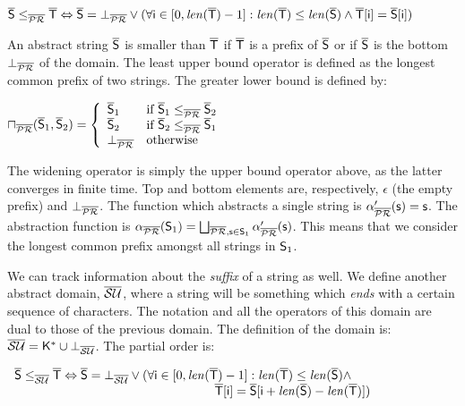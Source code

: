 \documentclass[orivec]{llncs}
\begin{document}
\noindent $\mathsf{\overline{S}} \leq_{\mathsf{\overline{\mathsf{\mathcal{PR}}}}} \mathsf{\overline{T}} \Leftrightarrow \mathsf{\overline{S}} = \bot_{\mathsf{\overline{\mathsf{\mathcal{PR}}}}} \lor (\forall \mathsf{i} \in [0, \mathit{len}(\mathsf{\overline{T}})-1] : \mathit{len}(\mathsf{\overline{T}}) \leq \mathit{len}(\mathsf{\overline{S}}) \land \mathsf{\overline{T}}[\mathsf{i}] =  \mathsf{\overline{S}}[\mathsf{i}]) $

An abstract string $\mathsf{\overline{S}}$ is smaller than $\mathsf{\overline{T}}$ if $\mathsf{\overline{T}}$ is a prefix of $\mathsf{\overline{S}}$ or if $\mathsf{\overline{S}}$ is the bottom $\bot_{\mathsf{\overline{\mathsf{\mathcal{PR}}}}}$ of the domain. The least upper bound operator is defined as the longest common prefix of two strings. The greater lower bound is defined by:
 
$
\sqcap_{\mathsf{\overline{\mathsf{\mathcal{PR}}}}} (\mathsf{\overline{S}}_1, \mathsf{\overline{S}}_2) = \left\{ \begin{array}{ll}
\mathsf{\overline{S}}_1 & \mbox{if } \mathsf{\overline{S}}_1 \leq_{\mathsf{\overline{\mathsf{\mathcal{PR}}}}} \mathsf{\overline{S}}_2 \\
\mathsf{\overline{S}}_2 & \mbox{if } \mathsf{\overline{S}}_2 \leq_{\mathsf{\overline{\mathsf{\mathcal{PR}}}}} \mathsf{\overline{S}}_1 \\
\bot_{\mathsf{\overline{\mathsf{\mathcal{PR}}}}} & \mbox{otherwise}
\end{array}\right.
$

The widening operator is simply the upper bound operator above, as the latter converges in finite time.
Top and bottom elements are, respectively, $\epsilon$ (the empty prefix) and $\bot_{\mathsf{\overline{\mathsf{\mathcal{PR}}}}}$. The function which abstracts a single string is $\alpha^{\prime}_{\mathsf{\overline{\mathsf{\mathcal{PR}}}}}(\mathsf{s})= \mathsf{s}$. The abstraction function is  
$\alpha_{\mathsf{\overline{\mathsf{\mathcal{PR}}}}}(\mathsf{S}_1) = \bigsqcup_{\mathsf{\overline{\mathsf{\mathcal{PR}}}}, \mathsf{s} \in \mathsf{S}_1}{\alpha^{\prime}_{\mathsf{\overline{\mathsf{\mathcal{PR}}}}}(\mathsf{s})}$.
This means that we consider the longest common prefix amongst all strings in $\mathsf{S}_1$. 

We can track information about the \emph{suffix} of a string as well. We define another abstract domain, $\mathsf{\overline{\mathsf{\mathcal{SU}}}}$, where a string will be something which \textit{ends} with a certain sequence of characters. The notation and all the operators of this domain are dual to those of the previous domain. The definition of the domain is: $\mathsf{\overline{\mathsf{\mathcal{SU}}}} = \mathsf{K}^* \cup \bot_{\mathsf{\overline{\mathsf{\mathcal{SU}}}}}$. The partial order is: 
 
$\begin{array}{l}
\aset{S}\leq_{\asuffix} \aset{T} \Leftrightarrow \aset{S} = \bot_{\asuffix} \lor ( \forall \cel{i} \in [0, \stringlength{\aset{T}}-1] : \stringlength{\aset{T}} \leq \stringlength{\aset{S}} \land \\
\hspace{160pt} \aset{T}[\cel{i}] = \aset{S}[\cel{i}+\stringlength{\aset{S}}-\stringlength{\aset{T}}])
\end{array}
$
\end{document}
